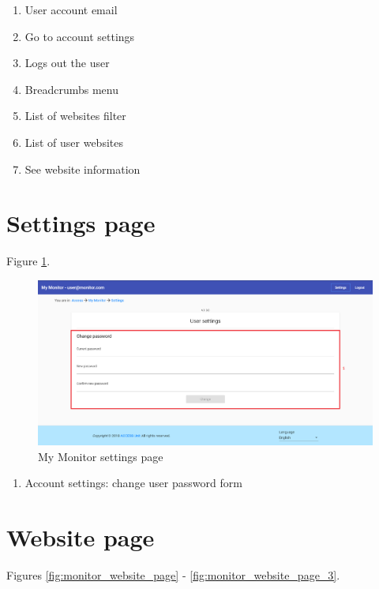 \begin{enumerate}
    \item User account email
    \item Go to account settings
    \item Logs out the user
    \item Breadcrumbs menu
    \item List of websites filter
    \item List of user websites
    \item See website information
\end{enumerate}

\clearpage

\section{Settings page}
\label{sec:monitor_settings_page}

Figure \ref{fig:monitor_settings_page}.

\begin{figure}[H]
    \centering
    \includegraphics[width=\linewidth]{lib/images/monitor/monitor_settings_page.png}
    \caption{My Monitor settings page}
    \label{fig:monitor_settings_page}
\end{figure}

\begin{enumerate}
    \item Account settings: change user password form
\end{enumerate}

\clearpage

\section{Website page}

Figures \ref{fig:monitor_website_page} - \ref{fig:monitor_website_page_3}.

